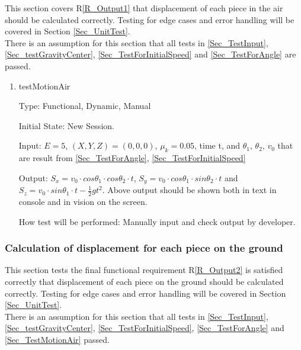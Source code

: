 \documentclass[12pt, titlepage]{article}
\newcommand{\rref}[1]{R\ref{#1}}
\begin{document}
This section covers \rref{R_Output1} that displacement of each piece in the air should be calculated correctly. Testing for edge cases and error handling will be covered in Section \ref{Sec_UnitTest}.\\ 
There is an assumption for this section that all tests in \ref{Sec_TestInput}, \ref{Sec_testGravityCenter}, \ref{Sec_TestForInitialSpeed} and \ref{Sec_TestForAngle} are passed.
\begin{enumerate}

\item{testMotionAir\\}

Type: Functional, Dynamic, Manual

Initial State: New Session.

Input: $E = 5$, $(X,Y,Z) = (0,0,0)$, $\mu_{k} = 0.05$, time t, and $\theta_{1}$, $\theta_{2}$, $v_{0}$ that are result from \ref{Sec_TestForAngle}, \ref{Sec_TestForInitialSpeed}

Output: $S_{x}=v_{0}\cdot cos\theta _{1}\cdot cos\theta _{2}\cdot t$, $S_{y}=v_{0}\cdot cos\theta _{1}\cdot sin\theta _{2}\cdot t$ and $S_{z}=v_{0}\cdot sin\theta _{1}\cdot t-\frac{1}{2}gt^{2}$. Above output should be shown both in text in console and in vision on the screen. 

How test will be performed: Manually input and check output by developer. 

\end{enumerate}

\subsubsection{Calculation of displacement for each piece on the ground}

This section tests the final functional requirement \rref{R_Output2} is satisfied correctly that displacement of each piece on the ground should be calculated correctly. Testing for edge cases and error handling will be covered in Section \ref{Sec_UnitTest}.\\
There is an assumption for this section that all tests in \ref{Sec_TestInput}, \ref{Sec_testGravityCenter}, \ref{Sec_TestForInitialSpeed}, \ref{Sec_TestForAngle} and \ref{Sec_TestMotionAir} passed.
\end{document}
